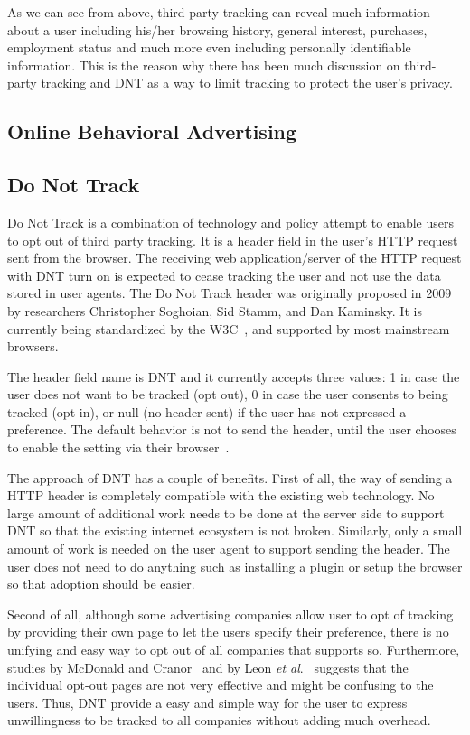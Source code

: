 \documentclass{sig-alternate}
\begin{document}
As we can see from above, third party tracking can reveal much information about a user including his/her browsing history, general interest, purchases, employment status and much more even including personally identifiable information. This is the reason why there has been much discussion on third-party tracking and DNT as a way to limit tracking to protect the user’s privacy.

\subsection*{Online Behavioral Advertising}


\subsection*{Do Not Track}

Do Not Track is a combination of technology and policy attempt to enable users to opt out of third party tracking. It is a header field in the user’s HTTP request sent from the browser. The receiving web application/server of the HTTP request with DNT turn on is expected to cease tracking the user and not use the data stored in user agents. The Do Not Track header was originally proposed in 2009 by researchers Christopher Soghoian, Sid Stamm, and Dan Kaminsky. It is currently being standardized by the W3C~\cite{wikidnt}, and supported by most mainstream browsers. 

The header field name is DNT and it currently accepts three values: 1 in case the user does not want to be tracked (opt out), 0 in case the user consents to being tracked (opt in), or null (no header sent) if the user has not expressed a preference. The default behavior is not to send the header, until the user chooses to enable the setting via their browser~\cite{wikidnt}. 

The approach of DNT has a couple of benefits. First of all, the way of sending a HTTP header is completely compatible with the existing web technology. No large amount of additional work needs to be done at the server side to support DNT so that the existing internet ecosystem is not broken. Similarly, only a small amount of work is needed on the user agent to support sending the header. The user does not need to do anything such as installing a plugin or setup the browser so that adoption should be easier.

Second of all, although some advertising companies allow user to opt of tracking by providing their own page to let the users specify their preference, there is no unifying and easy way to opt out of all companies that supports so. Furthermore, studies by McDonald and Cranor~\cite{mcdonald2010beliefs} and by Leon \emph{et al}.~\cite{leon2012johnny} suggests that the individual opt-out pages are not very effective and might be confusing to the users. Thus, DNT provide a easy and simple way for the user to express unwillingness to be tracked to all companies without adding much overhead.
\end{document}
